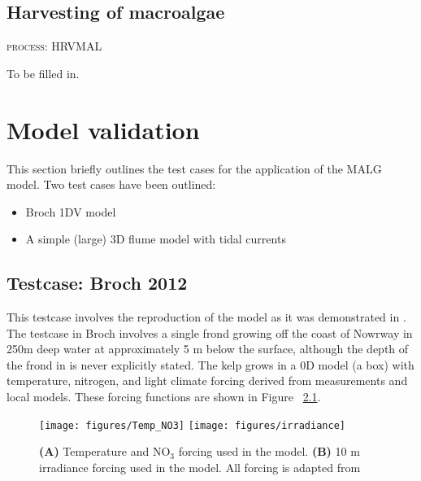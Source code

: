 \documentclass{deltares_manual}
\begin{document}
\section{Harvesting of macroalgae}
\begin{flushright}
	\textsc{process: HRVMAL}
\end{flushright}
To be filled in.
\pagebreak

\chapter{Model validation}
This section briefly outlines the test cases for the application of the MALG model. Two test cases have been outlined:
\begin{itemize}
	\item Broch 1DV model
	\item A simple (large) 3D flume model with tidal currents
\end{itemize}
\section{Testcase: Broch 2012}
This testcase involves the reproduction of the model as it was demonstrated in \cite{broch2012}. The testcase in Broch involves a single frond growing off the coast of Nowrway in 250m deep water at approximately 5 m below the surface, although the depth of the frond in \cite{broch2012} is never explicitly stated. The kelp grows in a 0D model (a box) with temperature, nitrogen, and light climate forcing derived from measurements and local models. These forcing functions are shown in Figure ~\ref{fig:forcing}.

\begin{figure}[H]
	\centering
	\texttt{[image: figures/Temp\_NO3]}
	\texttt{[image: figures/irradiance]}
	\caption[]{\textbf{(A)} Temperature and NO$_{3}$ forcing used in the model. \textbf{(B)} 10 m irradiance forcing used in the model. All forcing is adapted from \cite{broch2012}}
	\label{fig:forcing}
\end{figure}
\end{document}
